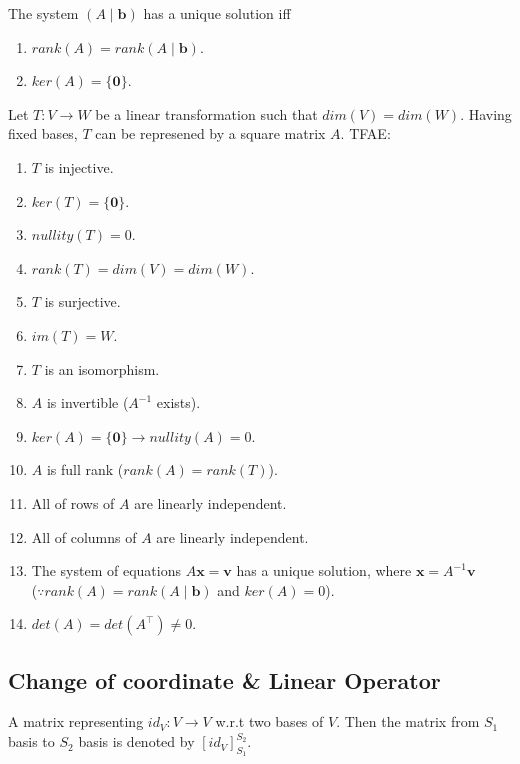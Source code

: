 \documentclass[12pt]{article}
\begin{document}
\begin{corollary}
    The system $(A\mid\mathbf{b})$ has a unique solution iff
    \begin{enumerate}
        \item $rank(A)=rank(A\mid\mathbf{b})$.
        \item $ker(A)=\{\mathbf{0}\}$.
    \end{enumerate}
\end{corollary}

\begin{theorem}
Let $T:V\rightarrow W$ be a linear transformation such that $dim(V)=dim(W)$.
Having fixed bases, $T$ can be represened by a square matrix $A$.
TFAE:
\begin{enumerate}
    \item $T$ is injective.
    \item $ker(T)=\{\mathbf{0}\}$.
    \item $nullity(T)=0$.
    \item $rank(T)=dim(V)=dim(W)$.
    \item $T$ is surjective.
    \item $im(T)=W$.
    \item $T$ is an isomorphism.
    \item $A$ is invertible ($A^{-1}$ exists).
    \item $ker(A)=\{\mathbf{0}\}\rightarrow nullity(A)=0$.
    \item $A$ is full rank ($rank(A)=rank(T)$).
    \item All of rows of $A$ are linearly independent.
    \item All of columns of $A$ are linearly independent.
    \item The system of equations $A\mathbf{x}=\mathbf{v}$ has a unique solution, where $\mathbf{x}=A^{-1}\mathbf{v}$\\
     ($\because rank(A) = rank(A\mid\mathbf{b})$ and $ker(A)=0$).
    \item $det(A)=det(A^\top)\neq 0.$
\end{enumerate}
\label{TFAE_ver1}
\end{theorem}

\subsection{Change of coordinate \& Linear Operator}

\begin{definition}
    A matrix representing $id_V: V\rightarrow V$ w.r.t two bases of $V$.
    Then the matrix from $S_1$ basis to $S_2$ basis is denoted by $[id_V]^{S_2}_{S_1}.$ 
\end{definition}
\end{document}
